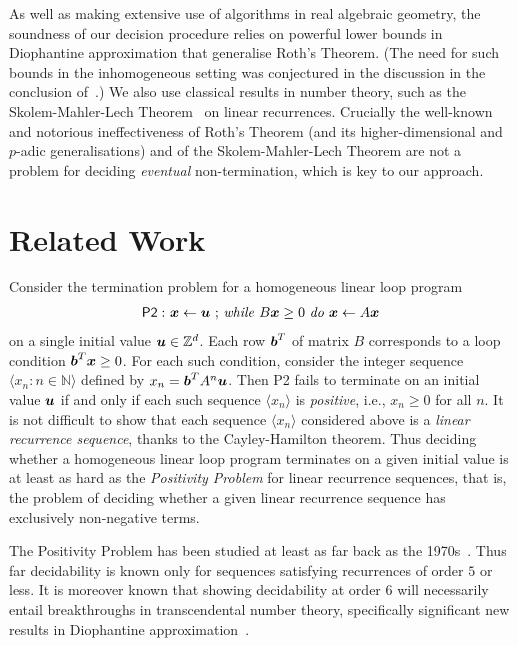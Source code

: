 As well as making extensive use of algorithms in real algebraic
geometry, the soundness of our decision procedure relies on powerful
lower bounds in Diophantine approximation that generalise Roth's
Theorem.  (The need for such bounds in the inhomogeneous setting was
conjectured in the discussion in the conclusion of~\cite{Bra06}.)  We
also use classical results in number theory, such as the
Skolem-Mahler-Lech Theorem~\cite{Lec53,Mah35,Sko34} on linear
recurrences.  Crucially the well-known and notorious ineffectiveness
of Roth's Theorem (and its higher-dimensional and $p$-adic
generalisations) and of the Skolem-Mahler-Lech Theorem are not a
problem for deciding \emph{eventual} non-termination, which is key to
our approach.

\section{Related Work}

Consider the termination problem for a homogeneous linear loop program
\begin{gather*}
\mathsf{P2:}\  \mbox{$\boldsymbol{x}\gets \boldsymbol{u}$ ;
\textit{while} $B\boldsymbol{x} \geq 0$ \textit{do} $\boldsymbol{x}\leftarrow A\boldsymbol{x}$}
\end{gather*}
on a single initial value $\boldsymbol{u}\in \mathbb{Z}^d$.  Each row
$\boldsymbol{b}^T$ of matrix $B$ corresponds to a loop condition
$\boldsymbol{b}^T\boldsymbol{x} \geq 0$.  For each such condition,
consider the integer sequence $\langle x_n : n \in \mathbb{N} \rangle$
defined by $x_n = \boldsymbol{b}^TA^n \boldsymbol{u}$.  Then
\textsf{P2} fails to terminate on an initial value $\boldsymbol{u}$ if
and only if each such sequence $\langle x_n \rangle$ is
\emph{positive}, i.e., $x_n \geq 0$ for all $n$.  It is not difficult
to show that each sequence $\langle x_n \rangle$ considered above is a
\emph{linear recurrence sequence}, thanks to the Cayley-Hamilton
theorem.  Thus deciding whether a homogeneous linear loop program
terminates on a given initial value is at least as hard as the
\emph{Positivity Problem} for linear recurrence sequences, that is,
the problem of deciding whether a given linear recurrence sequence has
exclusively non-negative terms.

The Positivity Problem has been studied at least as far back as the
1970s~\cite{BG07,HHH06,Liu10,RS94,Sal76}.  Thus far decidability is
known only for sequences satisfying recurrences of order $5$ or less.
It is moreover known that showing decidability at order $6$ will
necessarily entail breakthroughs in transcendental number theory,
specifically significant new results in Diophantine
approximation~\cite{OW14:SODA}.

